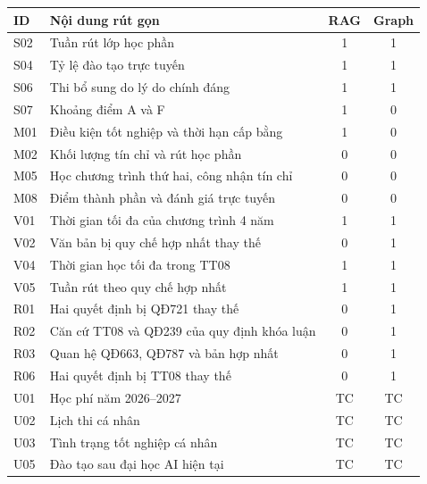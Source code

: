 \begin{tabularx}{\textwidth}{l X cc}
\toprule ID & Nội dung rút gọn & RAG & Graph \\
\midrule
S02 & Tuần rút lớp học phần & 1 & 1 \\
S04 & Tỷ lệ đào tạo trực tuyến & 1 & 1 \\
S06 & Thi bổ sung do lý do chính đáng & 1 & 1 \\
S07 & Khoảng điểm A và F & 1 & 0 \\
M01 & Điều kiện tốt nghiệp và thời hạn cấp bằng & 1 & 0 \\
M02 & Khối lượng tín chỉ và rút học phần & 0 & 0 \\
M05 & Học chương trình thứ hai, công nhận tín chỉ & 0 & 0 \\
M08 & Điểm thành phần và đánh giá trực tuyến & 0 & 0 \\
V01 & Thời gian tối đa của chương trình 4 năm & 1 & 1 \\
V02 & Văn bản bị quy chế hợp nhất thay thế & 0 & 1 \\
V04 & Thời gian học tối đa trong TT08 & 1 & 1 \\
V05 & Tuần rút theo quy chế hợp nhất & 1 & 1 \\
R01 & Hai quyết định bị QĐ721 thay thế & 0 & 1 \\
R02 & Căn cứ TT08 và QĐ239 của quy định khóa luận & 0 & 1 \\
R03 & Quan hệ QĐ663, QĐ787 và bản hợp nhất & 0 & 1 \\
R06 & Hai quyết định bị TT08 thay thế & 0 & 1 \\
U01 & Học phí năm 2026–2027 & TC & TC \\
U02 & Lịch thi cá nhân & TC & TC \\
U03 & Tình trạng tốt nghiệp cá nhân & TC & TC \\
U05 & Đào tạo sau đại học AI hiện tại & TC & TC \\
\bottomrule
\end{tabularx}